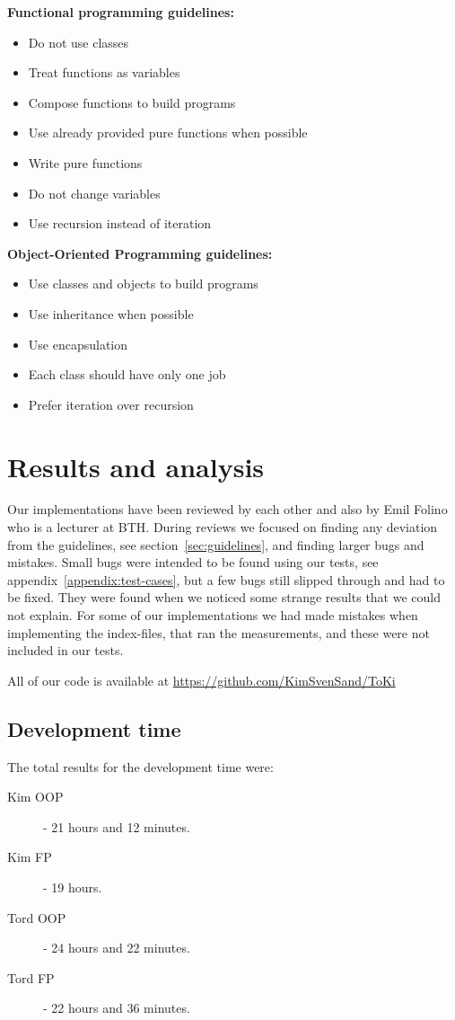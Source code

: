 \documentclass {article}
\begin{document}
\textbf{Functional programming guidelines:}
\begin{itemize}
\item Do not use classes
\item Treat functions as variables
\item Compose functions to build programs
\item Use already provided pure functions when possible
\item Write pure functions
\item Do not change variables
\item Use recursion instead of iteration
\end{itemize}

\textbf{Object-Oriented Programming guidelines:}
\begin{itemize}
\item Use classes and objects to build programs
\item Use inheritance when possible
\item Use encapsulation
\item Each class should have only one job
\item Prefer iteration over recursion
\end{itemize}

\section{Results and analysis}
Our implementations have been reviewed by each other and also by Emil Folino who is a lecturer at BTH. During reviews we focused on finding any deviation from the guidelines, see section~\ref{sec:guidelines}, and finding larger bugs and mistakes. Small bugs were intended to be found using our tests, see appendix~\ref{appendix:test-cases}, but a few bugs still slipped through and had to be fixed. They were found when we noticed some strange results that we could not explain. For some of our implementations we had made mistakes when implementing the index-files, that ran the measurements, and these were not included in our tests.

All of our code is available at \url{https://github.com/KimSvenSand/ToKi}
\subsection{Development time}
\label{sec:development-time}
The total results for the development time were:
\begin{description}
\item[Kim OOP] - 21 hours and 12 minutes.
\item[Kim FP] - 19 hours.
\item[Tord OOP] - 24 hours and 22 minutes.
\item[Tord FP] - 22 hours and 36 minutes.
\end{description}
\end{document}
